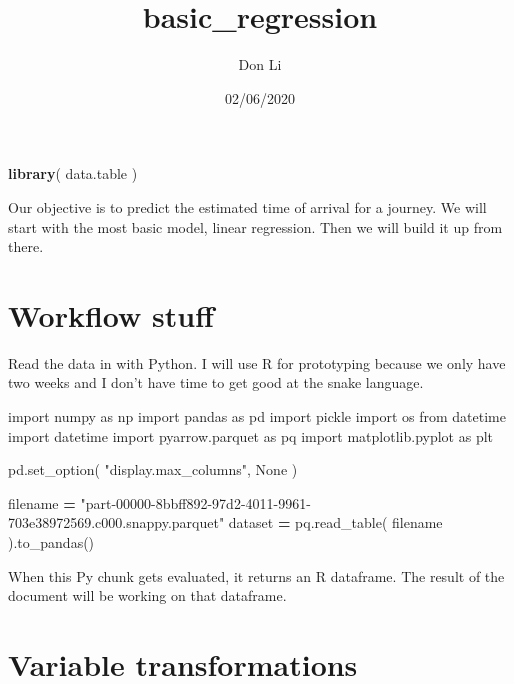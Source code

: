 \documentclass[]{article}
\title{basic\_regression}
\author{Don Li}
\date{02/06/2020}
\newenvironment{Shaded}{\begin{snugshade}}{\end{snugshade}}
\newcommand{\ImportTok}[1]{#1}
\newcommand{\KeywordTok}[1]{\textcolor[rgb]{0.13,0.29,0.53}{\textbf{#1}}}
\newcommand{\NormalTok}[1]{#1}
\newcommand{\OperatorTok}[1]{\textcolor[rgb]{0.81,0.36,0.00}{\textbf{#1}}}
\newcommand{\StringTok}[1]{\textcolor[rgb]{0.31,0.60,0.02}{#1}}
\newcommand{\VariableTok}[1]{\textcolor[rgb]{0.00,0.00,0.00}{#1}}
\begin{document}
\maketitle

\begin{Shaded}
\begin{Highlighting}[]
\KeywordTok{library}\NormalTok{( data.table )}
\end{Highlighting}
\end{Shaded}

Our objective is to predict the estimated time of arrival for a journey.
We will start with the most basic model, linear regression. Then we will
build it up from there.

\hypertarget{workflow-stuff}{%
\section{Workflow stuff}\label{workflow-stuff}}

Read the data in with Python. I will use R for prototyping because we
only have two weeks and I don't have time to get good at the snake
language.

\begin{Shaded}
\begin{Highlighting}[]
\ImportTok{import}\NormalTok{ numpy }\ImportTok{as}\NormalTok{ np}
\ImportTok{import}\NormalTok{ pandas }\ImportTok{as}\NormalTok{ pd}
\ImportTok{import}\NormalTok{ pickle}
\ImportTok{import}\NormalTok{ os}
\ImportTok{from}\NormalTok{ datetime }\ImportTok{import}\NormalTok{ datetime}
\ImportTok{import}\NormalTok{ pyarrow.parquet }\ImportTok{as}\NormalTok{ pq}
\ImportTok{import}\NormalTok{ matplotlib.pyplot }\ImportTok{as}\NormalTok{ plt}

\NormalTok{pd.set_option( }\StringTok{"display.max_columns"}\NormalTok{, }\VariableTok{None}\NormalTok{ )}

\NormalTok{filename }\OperatorTok{=} \StringTok{"part-00000-8bbff892-97d2-4011-9961-703e38972569.c000.snappy.parquet"}
\NormalTok{dataset }\OperatorTok{=}\NormalTok{ pq.read_table( filename ).to_pandas()}
\end{Highlighting}
\end{Shaded}

When this Py chunk gets evaluated, it returns an R dataframe. The result
of the document will be working on that dataframe.

\hypertarget{variable-transformations}{%
\section{Variable transformations}\label{variable-transformations}}
\end{document}
